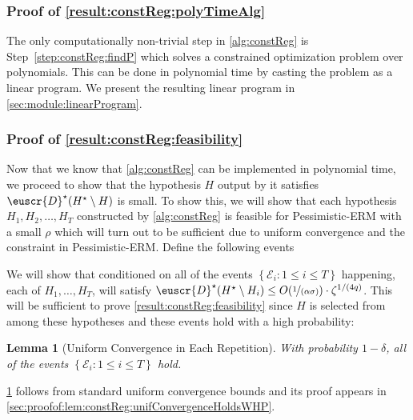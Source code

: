 \documentclass[11pt]{article}
\theoremstyle{plain}
\newtheorem{lemma}[theorem]{Lemma}
\theoremstyle{definition}
\theoremstyle{remark}
\newcommand{\sinparen}[1]{(#1)}
\newcommand{\inbrace}[1]{\left\{#1\right\}}
\newcommand{\evE}{\ensuremath{\mathscr{E}}}
\newcommand{\nfrac}[2]{\nicefrac{#1}{#2}}
\newcommand{\customcal}[1]{\euscr{#1}}
\newcommand{\cD}{\customcal{D}}
\newcommand{\pERM}{Pessimistic-ERM}
\newcommand{\optset}{{H^\star}}
\newcommand{\cDtrue}{\cD^\star}
\begin{document}
        \subsubsection{Proof of \cref{result:constReg:polyTimeAlg}}
            The only computationally non-trivial step in \cref{alg:constReg} is Step~\ref{step:constReg:findP} which solves a constrained optimization problem over polynomials.
            This can be done in polynomial time by casting the problem as a linear program.
            We present the resulting linear program in \cref{sec:module:linearProgram}.
            
        \subsubsection{Proof of \cref{result:constReg:feasibility}}
            Now that we know that \cref{alg:constReg} can be implemented in polynomial time, we proceed to show that the hypothesis $H$ output by it satisfies $\cDtrue(\optset\setminus H)$ is small.
            To show this, we will show that each hypothesis $H_1, H_2, \dots, H_T$ constructed by \cref{alg:constReg} is feasible for \pERM{} with a small $\rho$ which will turn out to be sufficient due to uniform convergence and the constraint in \pERM{}.
            Define the following events 
            We will show that conditioned on all of the events $\inbrace{\evE_i\colon 1\leq i\leq T}$ happening, each of $H_1,\dots,H_T$, will satisfy $\cDtrue(\optset\setminus H_i)\leq O\sinparen{\nfrac{1}{(\alpha\sigma)}}\cdot \zeta^{1/(4q)}$.
            This will be sufficient to prove \cref{result:constReg:feasibility} since $H$ is selected from among these hypotheses and these events hold with a high probability: 
            \begin{lemma}[Uniform Convergence in Each Repetition]\label{lem:constReg:unifConvergenceHoldsWHP}
                With probability $1-\delta$,  all of the events $\inbrace{\evE_i\colon 1\leq i\leq T}$ hold. 
            \end{lemma}
            \cref{lem:constReg:unifConvergenceHoldsWHP} follows from standard uniform convergence bounds and its proof appears in \cref{sec:proofof:lem:constReg:unifConvergenceHoldsWHP}.
\end{document}
